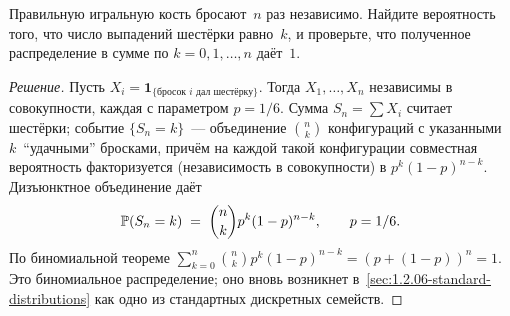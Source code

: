 \begin{problem}
\label{prob:exactly-k-out-of-n}
Правильную игральную кость бросают~$n$ раз независимо. Найдите вероятность того, что число выпадений шестёрки равно~$k$, и проверьте, что полученное распределение в сумме по $k = 0, 1, \dots, n$ даёт~$1$.
\end{problem}

\begin{proof}[Решение]
Пусть $X_i = \mathbf{1}_{\{\text{бросок }i\text{ дал шестёрку}\}}$. Тогда $X_1, \dots, X_n$ независимы в совокупности, каждая с параметром $p = 1/6$. Сумма $S_n = \sum X_i$ считает шестёрки; событие $\{S_n = k\}$~--- объединение $\binom{n}{k}$ конфигураций с указанными $k$~``удачными'' бросками, причём на каждой такой конфигурации совместная вероятность факторизуется (независимость в совокупности) в $p^k (1-p)^{n-k}$. Дизъюнктное объединение даёт
\[
  \mathbb{P}(S_n = k) \;=\; \binom{n}{k} p^k (1 - p)^{n-k}, \qquad p = 1/6.
\]
По биномиальной теореме $\sum_{k=0}^n \binom{n}{k} p^k (1-p)^{n-k} = (p + (1 - p))^n = 1$. Это биномиальное распределение; оно вновь возникнет в~\cref{sec:1.2.06-standard-distributions} как одно из стандартных дискретных семейств.
\end{proof}

